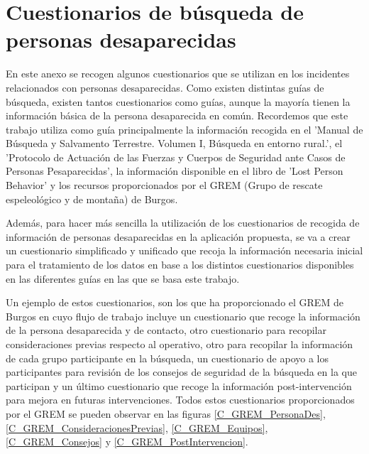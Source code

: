 
\chapter{Cuestionarios de búsqueda de personas desaparecidas}\label{GuiasBusquedaRescate}

En este anexo se recogen algunos cuestionarios que se utilizan en los incidentes relacionados con personas desaparecidas. Como existen distintas guías de búsqueda, existen tantos cuestionarios como guías, aunque la mayoría tienen la información básica de la persona desaparecida en común. Recordemos que este trabajo utiliza como guía principalmente la información recogida en el 'Manual de Búsqueda y Salvamento Terrestre. Volumen I, Búsqueda en entorno rural.', el 'Protocolo de Actuación de las Fuerzas y Cuerpos de Seguridad ante Casos de Personas Pesaparecidas', la información disponible en el libro de 'Lost Person Behavior' y los recursos proporcionados por el GREM (Grupo de rescate espeleológico y de montaña) de Burgos\cite{ManualDeBusquedayRescate, cndesprotocoloFFCC, GREM, libroLostPersonBehavior}. 

Además, para hacer más sencilla la utilización de los cuestionarios de recogida de información de personas desaparecidas en la aplicación propuesta, se va a crear un cuestionario simplificado y unificado que recoja la información necesaria inicial para el tratamiento de los datos en base a los distintos cuestionarios disponibles en las diferentes guías en las que se basa este trabajo.

Un ejemplo de estos cuestionarios, son los que ha proporcionado el GREM de Burgos en cuyo flujo de trabajo incluye un cuestionario que recoge la información de la persona desaparecida y de contacto, otro cuestionario para recopilar consideraciones previas respecto al operativo, otro para recopilar la información de cada grupo participante en la búsqueda, un cuestionario de apoyo a los participantes para revisión de los consejos de seguridad de la búsqueda en la que participan y un último cuestionario que recoge la información post-intervención para mejora en futuras intervenciones. Todos estos cuestionarios proporcionados por el GREM se pueden observar en las figuras \ref{C_GREM_PersonaDes}, \ref{C_GREM_ConsideracionesPrevias}, \ref{C_GREM_Equipos}, \ref{C_GREM_Consejos} y \ref{C_GREM_PostIntervencion}.


